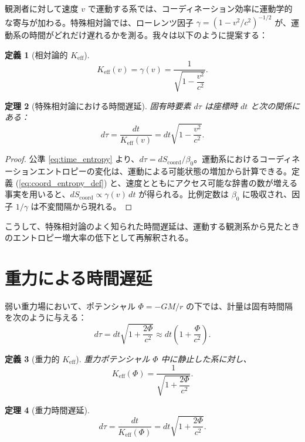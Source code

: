 \documentclass[12pt,a4paper]{article}
\newtheorem{theorem}{定理}[section]
\newtheorem{definition}[theorem]{定義}
\newcommand{\Keff}{K_{\mathrm{eff}}}
\newcommand{\Scoord}{S_{\mathrm{coord}}}
\begin{document}
	観測者に対して速度 \(v\) で運動する系では、コーディネーション効率に運動学的な寄与が加わる。特殊相対論では、ローレンツ因子 \(\gamma = (1-v^2/c^2)^{-1/2}\) が、運動系の時間がどれだけ遅れるかを測る。我々は以下のように提案する：
	\begin{definition}[相対論的 \(\Keff\)]
		\[
		\Keff(v) = \gamma(v) = \frac{1}{\sqrt{1-\dfrac{v^2}{c^2}}}.
		\]
	\end{definition}
	
	\begin{theorem}[特殊相対論における時間遅延]
		固有時要素 \(d\tau\) は座標時 \(dt\) と次の関係にある：
		\begin{equation}
			d\tau = \frac{dt}{\Keff(v)} = dt\sqrt{1-\frac{v^2}{c^2}}.
		\end{equation}
	\end{theorem}
	
	\begin{proof}
		公準 \ref{eq:time_entropy} より、\(d\tau = d\Scoord/\beta_0\)。運動系におけるコーディネーションエントロピーの変化は、運動による可能状態の増加から計算できる。定義 (\ref{eq:coord_entropy_def}) と、速度とともにアクセス可能な辞書の数が増える事実を用いると、\(d\Scoord \propto \gamma(v)\, dt\) が得られる。比例定数は \(\beta_0\) に吸収され、因子 \(1/\gamma\) は不変間隔から現れる。
	\end{proof}
	
	こうして、特殊相対論のよく知られた時間遅延は、運動する観測系から見たときのエントロピー増大率の低下として再解釈される。
	
	\section{重力による時間遅延}
	\label{sec:gr}
	
	弱い重力場において、ポテンシャル \(\Phi = -GM/r\) の下では、計量は固有時間隔を次のように与える：
	\begin{equation}
		d\tau = dt\sqrt{1 + \frac{2\Phi}{c^2}} \approx dt\left(1 + \frac{\Phi}{c^2}\right).
	\end{equation}
	
	\begin{definition}[重力的 \(\Keff\)]
		重力ポテンシャル \(\Phi\) 中に静止した系に対し、
		\[
		\Keff(\Phi) = \frac{1}{\sqrt{1 + \dfrac{2\Phi}{c^2}}}.
		\]
	\end{definition}
	
	\begin{theorem}[重力時間遅延]
		\begin{equation}
			d\tau = \frac{dt}{\Keff(\Phi)} = dt\sqrt{1 + \frac{2\Phi}{c^2}}.
		\end{equation}
	\end{theorem}
	
\end{document}
